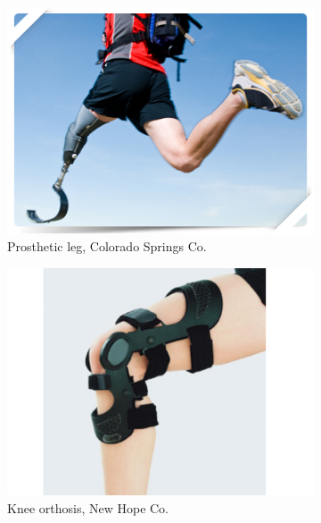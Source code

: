 \begin{figure}[h]
	\centering
    \begin{subfigure}[b]{0.3\textwidth}
        \includegraphics[width=\textwidth]{figures/prosthetic_leg.png}
        \caption{Prosthetic leg, Colorado Springs Co.}
        \label{fig:prosthetic_leg}
    \end{subfigure}
    \centering
    \begin{subfigure}[b]{0.3\textwidth}
        \includegraphics[width=\textwidth]{figures/orthotic_leg.pdf}
        \caption{Knee orthosis, New Hope Co.}
        \label{fig:orthotic_leg}
    \end{subfigure}
    \centering
    \begin{subfigure}[b]{0.3\textwidth}

\end{subfigure}
\end{figure}
